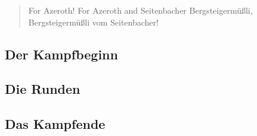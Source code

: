 \begin{quote}
    For Azeroth! For Azeroth and Seitenbacher Bergsteigermüßli, Bergsteigermüßli vom Seitenbacher!
\end{quote}
\subsection{Der Kampfbeginn}

\subsection{Die Runden}

\subsection{Das Kampfende}
